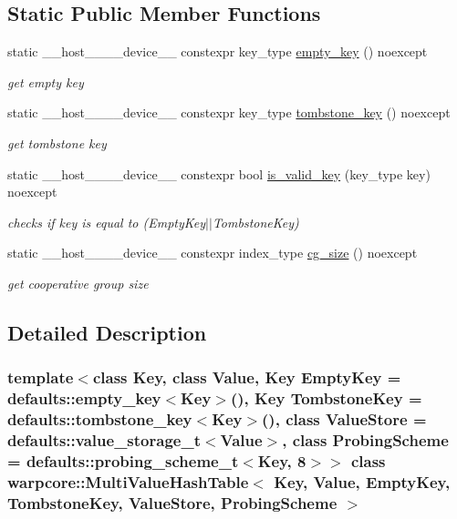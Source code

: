 \subsection*{Static Public Member Functions}
\begin{DoxyCompactItemize}
\item 
static \+\_\+\+\_\+host\+\_\+\+\_\+\+\_\+\+\_\+device\+\_\+\+\_\+ constexpr key\+\_\+type \hyperlink{classwarpcore_1_1MultiValueHashTable_aefacf0aa968291b9965e302e835ea249}{empty\+\_\+key} () noexcept
\begin{DoxyCompactList}\small\item\em get empty key \end{DoxyCompactList}\item 
static \+\_\+\+\_\+host\+\_\+\+\_\+\+\_\+\+\_\+device\+\_\+\+\_\+ constexpr key\+\_\+type \hyperlink{classwarpcore_1_1MultiValueHashTable_a6174c9b15d8772c8fa1874b6415e9937}{tombstone\+\_\+key} () noexcept
\begin{DoxyCompactList}\small\item\em get tombstone key \end{DoxyCompactList}\item 
static \+\_\+\+\_\+host\+\_\+\+\_\+\+\_\+\+\_\+device\+\_\+\+\_\+ constexpr bool \hyperlink{classwarpcore_1_1MultiValueHashTable_a65e099a2eea8ca9b800d02937b6c66a8}{is\+\_\+valid\+\_\+key} (key\+\_\+type key) noexcept
\begin{DoxyCompactList}\small\item\em checks if {\ttfamily key} is equal to {\ttfamily }(Empty\+Key$\vert$$\vert$\+Tombstone\+Key) \end{DoxyCompactList}\item 
static \+\_\+\+\_\+host\+\_\+\+\_\+\+\_\+\+\_\+device\+\_\+\+\_\+ constexpr index\+\_\+type \hyperlink{classwarpcore_1_1MultiValueHashTable_a2191f42810234e459bc4ef6e491ec929}{cg\+\_\+size} () noexcept
\begin{DoxyCompactList}\small\item\em get cooperative group size \end{DoxyCompactList}\end{DoxyCompactItemize}


\subsection{Detailed Description}
\subsubsection*{template$<$class Key, class Value, Key Empty\+Key = defaults\+::empty\+\_\+key$<$\+Key$>$(), Key Tombstone\+Key = defaults\+::tombstone\+\_\+key$<$\+Key$>$(), class Value\+Store = defaults\+::value\+\_\+storage\+\_\+t$<$\+Value$>$, class Probing\+Scheme = defaults\+::probing\+\_\+scheme\+\_\+t$<$\+Key, 8$>$$>$\newline
class warpcore\+::\+Multi\+Value\+Hash\+Table$<$ Key, Value, Empty\+Key, Tombstone\+Key, Value\+Store, Probing\+Scheme $>$}

